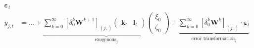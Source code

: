 \begin{align}
                        \boldsymbol \varepsilon_{t}
    \\[1em]
    \label{eq:static-red-endogenous-effect}
    y_{j,t}     &= \dots
                    + \underbrace{
                        \sum_{k=0}^\infty
                        \left[
                            \delta_0^k \mathbf W^{k+1}
                        \right]_{(j,)}
                        \begin{pmatrix}\mathbf k_t & \mathbf l_t\end{pmatrix}
                        \begin{pmatrix}
                            \xi_0       \\
                            \zeta_0
                        \end{pmatrix}
                    }_{\text{exogenous}_j}
                    + \underbrace{
                        \sum_{k=0}^\infty
                        [\delta_0^k \mathbf W^k]_{(j,)} \cdot
                    \boldsymbol \varepsilon_t
                    }_{\text{error transformation}_j}
\end{align}

